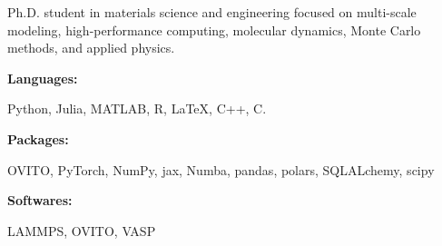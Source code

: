 \documentclass[9pt]{developercv} %
\begin{document}
\begin{minipage}[t]{0.46\textwidth}
	\vspace{-6pt}
 
	Ph.D. student in materials science and engineering focused on multi-scale modeling, high-performance computing, molecular dynamics, Monte Carlo methods, and applied physics. \\
\end{minipage}
\hfill %
\begin{minipage}[t]{0.465\textwidth}
    \vspace{-6pt}
    
    \begin{minipage}[t]{0.2\textwidth}
        \textbf{Languages:}
    \end{minipage}
    \hfill
    \begin{minipage}[t]{0.73\textwidth}
    Python, Julia, MATLAB, R, \LaTeX, C++, C.  
    \end{minipage}
    \vspace{4mm}

    \begin{minipage}[t]{0.2\textwidth}
        \textbf{Packages:}
    \end{minipage}
    \hfill
    \begin{minipage}[t]{0.73\textwidth}
    OVITO, PyTorch, NumPy, jax, Numba, pandas, polars, SQLALchemy, scipy
    \end{minipage}
    \vspace{4mm}
    
    \begin{minipage}[t]{0.2\textwidth}
        \textbf{Softwares:}
    \end{minipage}
    \hfill
    \begin{minipage}[t]{0.73\textwidth}
    LAMMPS, OVITO, VASP
    \end{minipage}
    \vspace{1mm}
    
\end{minipage}
\end{document}
